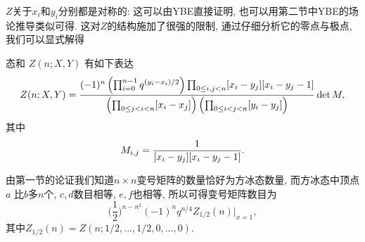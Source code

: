 \documentclass[twoside]{article}
\begin{document}

$Z$关于$x_i$和$y_i$分别都是对称的: 这可以由YBE直接证明, 也可以用第二节中YBE的场论推导类似可得. 这对$Z$的结构施加了很强的限制, 通过仔细分析它的零点与极点, 我们可以显式解得
\begin{theorem} 
    \label{thkorepin}
    态和 $Z(n;X,Y)$ 有如下表达
    $$Z(n;X,Y) = {(-1)^n\left(\prod_{i=0}^{n-1} q^{(y_i-x_i)/2}\right)
    \prod_{0 \le i,j < n} [x_i-y_j][x_i-y_j-1] \over \left(\prod_{0 \le j<i<n}
    [x_i-x_j]\right)\left(\prod_{0 \le i < j < n} [y_i-y_j]\right)}\det M,$$
    其中
    $$M_{i,j} = {1 \over [x_i - y_j][x_i - y_j - 1]}.$$
\end{theorem}

由第一节的论证我们知道$n\times n$变号矩阵的数量恰好为方冰态数量, 而方冰态中顶点$a$ 比$b$多$n$个, $c,d$数目相等, $e,f$也相等, 所以可得变号矩阵数目为
$$ \biggl(\frac12\biggr)^{n-n^2}(-1)^n q^{n/4} Z_{1/2}(n)|_{x=1},$$
其中$Z_{1/2}(n)=Z(n;1/2,...,1/2,0,...,0)$. 
\end{document}
